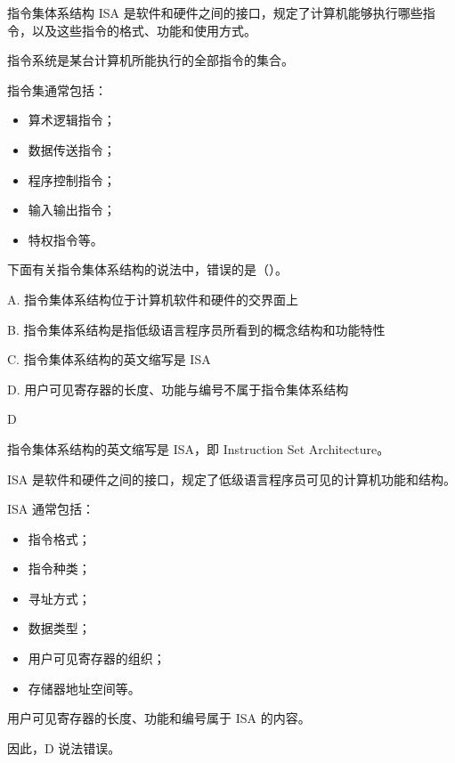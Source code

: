 \begin{knowledge}
指令集体系结构 ISA 是软件和硬件之间的接口，规定了计算机能够执行哪些指令，以及这些指令的格式、功能和使用方式。

指令系统是某台计算机所能执行的全部指令的集合。

指令集通常包括：
\begin{itemize}
    \item 算术逻辑指令；
    \item 数据传送指令；
    \item 程序控制指令；
    \item 输入输出指令；
    \item 特权指令等。
\end{itemize}
\end{knowledge}


\begin{question}
下面有关指令集体系结构的说法中，错误的是（）。

A. 指令集体系结构位于计算机软件和硬件的交界面上

B. 指令集体系结构是指低级语言程序员所看到的概念结构和功能特性

C. 指令集体系结构的英文缩写是 ISA

D. 用户可见寄存器的长度、功能与编号不属于指令集体系结构
\end{question}

\begin{answer}
D
\end{answer}

\begin{analysisenv}
指令集体系结构的英文缩写是 ISA，即 Instruction Set Architecture。

ISA 是软件和硬件之间的接口，规定了低级语言程序员可见的计算机功能和结构。

ISA 通常包括：

\begin{itemize}
    \item 指令格式；
    \item 指令种类；
    \item 寻址方式；
    \item 数据类型；
    \item 用户可见寄存器的组织；
    \item 存储器地址空间等。
\end{itemize}

用户可见寄存器的长度、功能和编号属于 ISA 的内容。

因此，D 说法错误。
\end{analysisenv}



